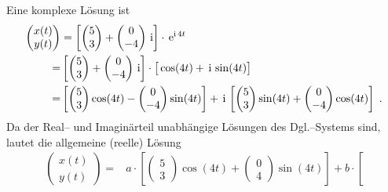 {\begin{iii}
Eine komplexe Lösung ist 
\begin{align*}
\begin{pmatrix}
x(t) \\ 
y(t)
\end{pmatrix}  &=  \left[ \begin{pmatrix}
5 \\ 
3
\end{pmatrix}+\begin{pmatrix}
0 \\ 
-4
\end{pmatrix} \,\text{i}\right] \cdot \,\text{e}^{\text{i}\,4t} \\ 
 = & \left[ \begin{pmatrix}
5 \\ 
3
\end{pmatrix} + \begin{pmatrix}
0 \\ 
-4
\end{pmatrix} \,\text{i}\right] \cdot \big[\cos (4t)+\,\text{i}\,\sin (4t)\big] \\ 
 = & \left[ \begin{pmatrix}
5 \\ 
3
\end{pmatrix} \cos (4t)-\begin{pmatrix}
0 \\ 
-4
\end{pmatrix} \sin (4t)\right] +\,\text{i\thinspace }\left[ \begin{pmatrix}
5 \\ 
3
\end{pmatrix} \sin (4t)+
\begin{pmatrix}
0 \\ 
-4
\end{pmatrix}
 \cos (4t)\right] \;.
\end{align*}
Da der Real-- und Imaginärteil unabhängige Lösungen des Dgl.--Systems sind, lautet die allgemeine (reelle) Lösung 
\begin{align*}
\begin{pmatrix}
x(t) \\ 
y(t)
\end{pmatrix}
  = & a\cdot \left[  
\begin{pmatrix}
5 \\ 
3
\end{pmatrix}
 \cos (4t)+ 
\begin{pmatrix}
0 \\ 
4
\end{pmatrix}
 \sin (4t)\right] +b\cdot \left[  

\end{align*}
\end{iii}}
